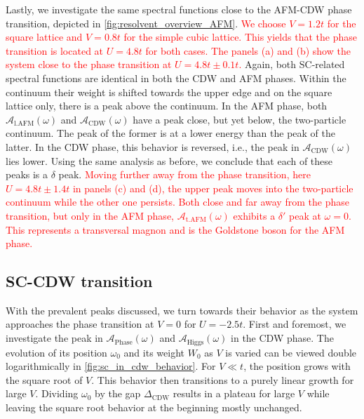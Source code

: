 \documentclass[
    reprint, 
    aps,
    preprintnumbers,
    twocolumn,
    prb,
    superscriptaddress
]{revtex4-2}
\newcommand{\spectral}[1]{\mathcal{A}_\text{#1}  (\omega)}
\newcommand{\markEdited}{red}
\begin{document}
Lastly, we investigate the same spectral functions close to the AFM-CDW phase transition, depicted in \autoref{fig:resolvent_overview_AFM}.
\textcolor{\markEdited}{We choose $V=1.2t$ for the square lattice and $V=0.8t$ for the simple cubic lattice.
This yields that the phase transition is located at $U=4.8t$ for both cases. 
The panels (a) and (b) show the system close to the phase transition at $U=4.8t \pm 0.1t$.}
Again, both SC-related spectral functions are identical in both the CDW and AFM phases.
Within the continuum their weight is shifted towards the upper edge and on the square lattice only, there is a peak above the continuum.
In the AFM phase, both $\spectral{l.AFM}$ and $\spectral{CDW}$ have a peak close, but yet below, the two-particle continuum.
The peak of the former is at a lower energy than the peak of the latter.
In the CDW phase, this behavior is reversed, i.e., the peak in $\spectral{CDW}$ lies lower.
Using the same analysis as before, we conclude that each of these peaks is a $\delta$ peak.
\textcolor{\markEdited}{Moving further away from the phase transition, here $U=4.8t \pm 1.4t$ in panels (c) and (d), the upper peak moves into the two-particle continuum while the other one persists.
Both close and far away from the phase transition, but only in the AFM phase, $\spectral{t.AFM}$ exhibits a $\delta'$ peak at $\omega=0$.
This represents a transversal magnon and is the Goldstone boson for the AFM phase.}



\subsection{SC-CDW transition}

With the prevalent peaks discussed, we turn towards their behavior as the system approaches the phase transition at $V=0$ for $U=-2.5t$.
First and foremost, we investigate the peak in $\spectral{Phase}$ and $\spectral{Higgs}$ in the CDW phase.
The evolution of its position $\omega_0$ and its weight $W_0$ as $V$ is varied can be viewed double logarithmically in \autoref{fig:sc_in_cdw_behavior}.
For $V \ll t$, the position grows with the square root of $V$. This behavior then transitions to a purely linear growth for large $V$.
Dividing $\omega_0$ by the gap $\Delta_\text{CDW}$ results in a plateau for large $V$ while leaving the square root behavior at the beginning mostly unchanged.
\end{document}
